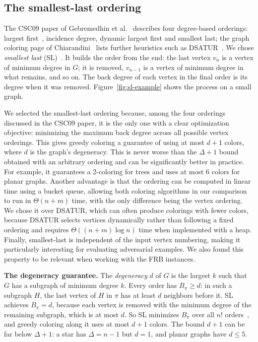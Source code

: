 \documentclass[acmsmall,nonacm]{acmart}
\begin{document}
\subsection{The smallest-last ordering}
\label{sec:sl}

The CSC09 paper of Gebremedhin et al.~\cite{gebremedhin2009} describes four degree-based orderings:
largest first~\cite{welsh1967}, incidence degree, dynamic largest first and
smallest last; the graph coloring page of Chiarandini~\cite{chiarandini} lists
further heuristics such as DSATUR~\cite{brelaz1979}. We chose \emph{smallest last} (SL)~\cite{matula1983}. It builds
the order from the end: the last vertex $v_n$ is a vertex of minimum degree in
$G$; it is removed, $v_{n-1}$ is a vertex of minimum degree in what remains,
and so on. The back degree of each vertex in the final order is its degree when
it was removed. Figure~\ref{fig:sl-example} shows the process on a small graph.

We selected the smallest-last ordering because, among the four orderings discussed in the CSC09 paper, it is the only one with a clear optimization objective: minimizing the maximum back degree across all possible vertex orderings. This gives greedy coloring a guarantee of using at most \(d+1\) colors, where \(d\) is the graph's degeneracy. This is never worse than the \(\Delta+1\) bound obtained with an arbitrary ordering and can be significantly better in practice. For example, it guarantees a 2-coloring for trees and uses at most 6 colors for planar graphs. Another advantage is that the ordering can be computed in linear time using a bucket queue, allowing both coloring algorithms in our comparison to run in \(\Theta(n+m)\) time, with the only difference being the vertex ordering. We chose it over DSATUR, which can often produce colorings with fewer colors, because DSATUR selects vertices dynamically rather than following a fixed ordering and requires \(\Theta((n+m)\log n)\) time when implemented with a heap. Finally, smallest-last is independent of the input vertex numbering, making it particularly interesting for evaluating adversarial examples. We also found this property to be relevant when working with the FRB instances.

\textbf{The degeneracy guarantee.} The \emph{degeneracy} $d$ of $G$ is the
largest $k$ such that $G$ has a subgraph of minimum degree $k$. Every order has
$B_\pi\ge d$: in such a subgraph $H$, the last vertex of $H$ in $\pi$ has at
least $d$ neighbors before it. SL achieves $B_\pi=d$, because each vertex is
removed with the minimum degree of the remaining subgraph, which is at most
$d$. So SL minimizes $B_\pi$ over all $n!$ orders~\cite{gebremedhin2009}, and
greedy coloring along it uses at most $d+1$ colors. The bound $d+1$ can be far
below $\Delta+1$: a star has $\Delta=n-1$ but $d=1$, and planar graphs have
$d\le5$.
\end{document}
